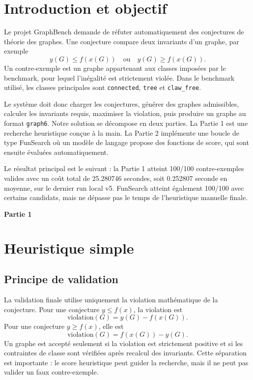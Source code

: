 \documentclass[11pt,a4paper]{article}
\begin{document}
\tableofcontents
\clearpage

\section{Introduction et objectif}

Le projet GraphBench demande de réfuter automatiquement des conjectures de théorie des graphes. Une conjecture compare deux invariants d'un graphe, par exemple
\[
  y(G) \le f(x(G)) \quad \text{ou} \quad y(G) \ge f(x(G)).
\]
Un contre-exemple est un graphe appartenant aux classes imposées par le benchmark, pour lequel l'inégalité est strictement violée. Dans le benchmark utilisé, les classes principales sont \texttt{connected}, \texttt{tree} et \texttt{claw\_free}.

Le système doit donc charger les conjectures, générer des graphes admissibles, calculer les invariants requis, maximiser la violation, puis produire un graphe au format \texttt{graph6}. Notre solution se décompose en deux parties. La Partie 1 est une recherche heuristique conçue à la main. La Partie 2 implémente une boucle de type FunSearch où un modèle de langage propose des fonctions de score, qui sont ensuite évaluées automatiquement.

Le résultat principal est le suivant : la Partie 1 atteint 100/100 contre-exemples valides avec un coût total de 25.280746 secondes, soit 0.252807 seconde en moyenne, sur le dernier run local v5. FunSearch atteint également 100/100 avec certains candidats, mais ne dépasse pas le temps de l'heuristique manuelle finale.

\clearpage
\begin{center}
  {\LARGE\bfseries Partie 1}
\end{center}
\vspace{0.6em}

\section{Heuristique simple}

\subsection{Principe de validation}

La validation finale utilise uniquement la violation mathématique de la conjecture. Pour une conjecture \(y \le f(x)\), la violation est
\[
  \text{violation}(G)=y(G)-f(x(G)).
\]
Pour une conjecture \(y \ge f(x)\), elle est
\[
  \text{violation}(G)=f(x(G))-y(G).
\]
Un graphe est accepté seulement si la violation est strictement positive et si les contraintes de classe sont vérifiées après recalcul des invariants. Cette séparation est importante : le score heuristique peut guider la recherche, mais il ne peut pas valider un faux contre-exemple.
\end{document}
